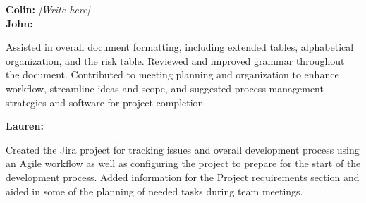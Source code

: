 \documentclass[english,12pt]{article}
\begin{document}
\textbf{Colin:} \textit{[Write here]} \\

\textbf{John:} 

Assisted in overall document formatting, 
including extended tables, alphabetical organization, 
and the risk table. Reviewed and improved grammar 
throughout the document. Contributed to meeting planning and organization to 
enhance workflow, streamline ideas and scope, and suggested process management 
strategies and software for project completion.

\textbf{Lauren:} 

Created the Jira project for tracking issues and overall development 
process using an Agile workflow as well as configuring the project to prepare for 
the start of the development process. Added information for the Project requirements 
section and aided in some of the planning of needed tasks during team meetings.
\end{document}
